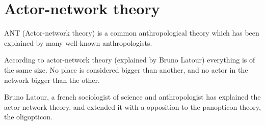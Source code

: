\section{Actor-network theory}
ANT (Actor-network theory) is a common anthropological theory which has been explained by many well-known anthropologists.

According to actor-network theory (explained by Bruno Latour) everything is of the same size. No place is considered bigger than another, and no actor in the network bigger than the other. 
\cite{bookref:actor-network}

Bruno Latour, a french sociologist of science and anthropologist has explained the actor-network theory, and extended it with a opposition to the panopticon theory, the oligopticon.



\newpage
